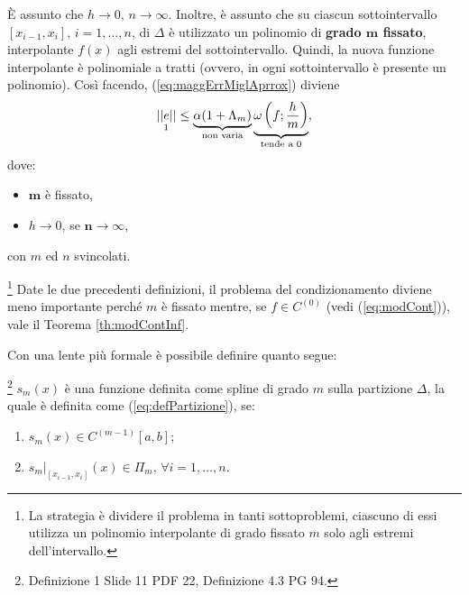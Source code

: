 È assunto che $h\rightarrow 0,\, n\rightarrow\infty$. Inoltre, è assunto che su ciascun sottointervallo $[x_{i-1}, x_i],\, i=1,\hdots, n$, di $\Delta$ è utilizzato un polinomio di \textbf{grado $\boldsymbol m$ fissato}, interpolante $f(x)$ agli estremi del sottointervallo. Quindi, la nuova funzione interpolante è polinomiale a tratti (ovvero, in ogni sottointervallo è presente un polinomio).
Così facendo, (\ref{eq:maggErrMiglAprrox}) diviene
\begin{equation*}
    \underset{\footnotemark}{||e||}\leq\underbrace{\alpha (1+\Lambda_m)}_{\text{non varia}}\underbrace{\omega\left(f;\frac{h}{m}\right)}_{\text{tende a 0}},
\end{equation*}
dove:
\begin{itemize}
    \item $\boldsymbol{m}$ è fissato,
    \item $h\rightarrow 0$, se $\boldsymbol{n}\rightarrow\infty$,
\end{itemize}
con $m$ ed $n$ svincolati.

\footnote{La strategia è dividere il problema in tanti sottoproblemi, ciascuno di essi utilizza un polinomio interpolante di grado fissato $m$ solo agli estremi dell'intervallo.} Date le due precedenti definizioni, il problema del condizionamento diviene meno importante perché $m$ è fissato mentre, se $f\in C^{(0)}$ (vedi (\ref{eq:modCont})), vale il Teorema \ref{th:modContInf}.

Con una lente più formale è possibile definire quanto segue:
\begin{definition}\label{def:spline}
    \footnote{Definizione 1 Slide 11 PDF 22, Definizione 4.3 PG 94.}
    $s_m(x)$ è una funzione definita come spline di grado $m$ sulla partizione $\Delta$, la quale è definita come (\ref{eq:defPartizione}), se:
    \begin{enumerate}
        \item $s_m(x)\in C^{(m-1)}[a,b]$; \footnotemark
        \item $s_m|_{[x_{i-1},x_i]}(x)\in\Pi_m,\,\forall i=1,\hdots,n.$
    \end{enumerate}
\end{definition}


